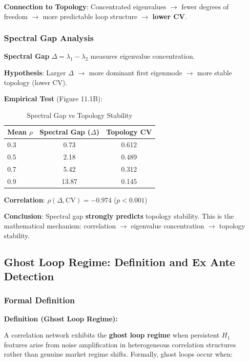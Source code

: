 \textbf{Connection to Topology}: Concentrated eigenvalues $\rightarrow$ fewer degrees of freedom $\rightarrow$ more predictable loop structure $\rightarrow$ \textbf{lower CV}.

\subsubsection{Spectral Gap Analysis}

\textbf{Spectral Gap} $\Delta = \lambda_1 - \lambda_2$ measures eigenvalue concentration.

\textbf{Hypothesis}: Larger $\Delta$ $\rightarrow$ more dominant first eigenmode $\rightarrow$ more stable topology (lower CV).

\textbf{Empirical Test} (Figure 11.1B):

\begin{table}[H]
\centering
\caption{Spectral Gap vs Topology Stability}
\label{tab:spectral-gap}
\begin{tabular}{@{}lcc@{}}
\toprule
\textbf{Mean $\rho$} & \textbf{Spectral Gap ($\Delta$)} & \textbf{Topology CV} \\
\midrule
0.3 & 0.73 & 0.612 \\
0.5 & 2.18 & 0.489 \\
0.7 & 5.42 & 0.312 \\
0.9 & 13.87 & 0.145 \\
\bottomrule
\end{tabular}
\end{table}

\textbf{Correlation}: $\rho(\Delta, \text{CV}) = \mathbf{-0.974}$ ($p < 0.001$)

\textbf{Conclusion}: Spectral gap \textbf{strongly predicts} topology stability. This is the mathematical mechanism: correlation $\rightarrow$ eigenvalue concentration $\rightarrow$ topology stability.

\subsection{Ghost Loop Regime: Definition and Ex Ante Detection}
\label{sec:ghost-loops}

\subsubsection{Formal Definition}

\textbf{Definition (Ghost Loop Regime):}

A correlation network exhibits the \textbf{ghost loop regime} when persistent $H_1$ features arise from noise amplification in heterogeneous correlation structures rather than genuine market regime shifts. Formally, ghost loops occur when:

